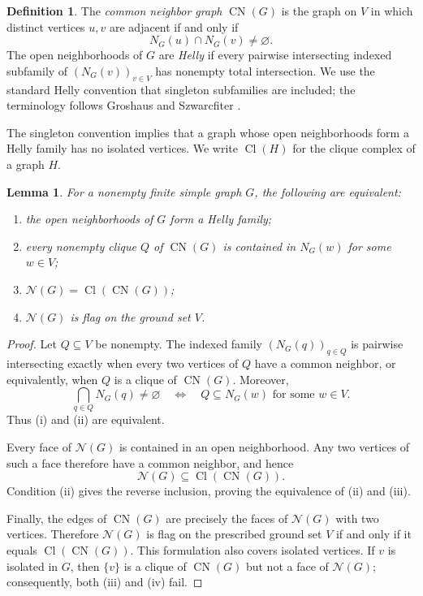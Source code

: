 \documentclass[11pt]{amsart}
\newtheorem{lemma}[theorem]{Lemma}
\theoremstyle{definition}
\newtheorem{definition}[theorem]{Definition}
\theoremstyle{remark}
\numberwithin{equation}{section}
\newcommand{\NN}{\mathcal N}
\newcommand{\Cl}{\operatorname{Cl}}
\newcommand{\CN}{\operatorname{CN}}
\begin{document}
	\begin{definition}
		The \emph{common neighbor graph} \(\CN(G)\) is the graph on \(V\) in which
		distinct vertices \(u,v\) are adjacent if and only if
		\[
		N_G(u)\cap N_G(v)\ne\varnothing.
		\]
		The open neighborhoods of \(G\) are \emph{Helly} if every pairwise
		intersecting indexed subfamily of \((N_G(v))_{v\in V}\) has nonempty total
		intersection. We use the standard Helly convention that singleton
		subfamilies are included; the terminology follows Groshaus and Szwarcfiter
		\cite{GroshausSzwarcfiter2008}.
	\end{definition}
	
	The singleton convention implies that a graph whose open neighborhoods form a
	Helly family has no isolated vertices. We write \(\Cl(H)\) for the clique
	complex of a graph \(H\).
	
	\begin{lemma}\label{lem:helly-flag}
		For a nonempty finite simple graph \(G\), the following are equivalent:
		\begin{enumerate}[label=\textup{(\roman*)}]
			\item the open neighborhoods of \(G\) form a Helly family;
			\item every nonempty clique \(Q\) of \(\CN(G)\) is contained in
			\(N_G(w)\) for some \(w\in V\);
			\item \(\NN(G)=\Cl(\CN(G))\);
			\item \(\NN(G)\) is flag on the ground set \(V\).
		\end{enumerate}
	\end{lemma}
	
	\begin{proof}
		Let \(Q\subseteq V\) be nonempty. The indexed family
		\((N_G(q))_{q\in Q}\) is pairwise intersecting exactly when every two
		vertices of \(Q\) have a common neighbor, or equivalently, when \(Q\) is a
		clique of \(\CN(G)\). Moreover,
		\[
		\bigcap_{q\in Q}N_G(q)\ne\varnothing
		\quad\Longleftrightarrow\quad
		Q\subseteq N_G(w)\text{ for some }w\in V.
		\]
		Thus \textup{(i)} and \textup{(ii)} are equivalent.
		
		Every face of \(\NN(G)\) is contained in an open neighborhood. Any two
		vertices of such a face therefore have a common neighbor, and hence
		\[
		\NN(G)\subseteq\Cl(\CN(G)).
		\]
		Condition \textup{(ii)} gives the reverse inclusion, proving the equivalence
		of \textup{(ii)} and \textup{(iii)}.
		
		Finally, the edges of \(\CN(G)\) are precisely the faces of \(\NN(G)\)
		with two vertices. Therefore \(\NN(G)\) is flag on the prescribed ground set
		\(V\) if and only if it equals \(\Cl(\CN(G))\). This formulation also covers
		isolated vertices. If \(v\) is isolated in \(G\), then \(\{v\}\) is a
		clique of \(\CN(G)\) but not a face of \(\NN(G)\); consequently, both
		\textup{(iii)} and \textup{(iv)} fail.
	\end{proof}
	
\end{document}
